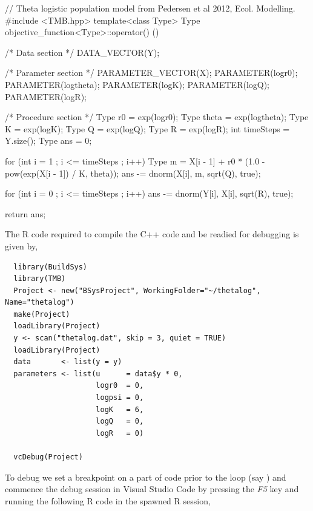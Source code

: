 \begin{Schunk}
  \begin{Sinput}
    // Theta logistic population model from Pedersen et al 2012, Ecol. Modelling.
    #include <TMB.hpp>
    template<class Type>
    Type objective_function<Type>::operator() ()
    {
      /* Data section */
      DATA_VECTOR(Y);

      /* Parameter section */
      PARAMETER_VECTOR(X);
      PARAMETER(logr0);
      PARAMETER(logtheta);
      PARAMETER(logK);
      PARAMETER(logQ);
      PARAMETER(logR);

      /* Procedure section */
      Type r0       = exp(logr0);
      Type theta    = exp(logtheta);
      Type K        = exp(logK);
      Type Q        = exp(logQ);
      Type R        = exp(logR);
      int timeSteps = Y.size();
      Type ans      = 0;

      for (int i = 1 ; i <= timeSteps ; i++)
      {
        Type m = X[i - 1] + r0 * (1.0 - pow(exp(X[i - 1]) / K, theta));
        ans -= dnorm(X[i], m, sqrt(Q), true);
      }

      for (int i = 0 ; i <= timeSteps ; i++)
      {
        ans -= dnorm(Y[i], X[i], sqrt(R), true);
      }

      return ans;
    }
  \end{Sinput}
\end{Schunk}

The R code required to compile the C++ code and be readied for debugging is given by,

\begin{Schunk}
  \begin{verbatim}
  library(BuildSys)
  library(TMB)
  Project <- new("BSysProject", WorkingFolder="~/thetalog", Name="thetalog")
  make(Project)
  loadLibrary(Project)
  y <- scan("thetalog.dat", skip = 3, quiet = TRUE)
  loadLibrary(Project)
  data       <- list(y = y)
  parameters <- list(u      = data$y * 0,
                     logr0  = 0,
                     logpsi = 0,
                     logK   = 6,
                     logQ   = 0,
                     logR   = 0)

  vcDebug(Project)
  \end{verbatim}
\end{Schunk}

To debug we set a breakpoint on a part of code prior to the loop (say ) and commence 
the debug session in Visual Studio Code by pressing the \emph{F5} key and running the following R code 
in the spawned R session,

